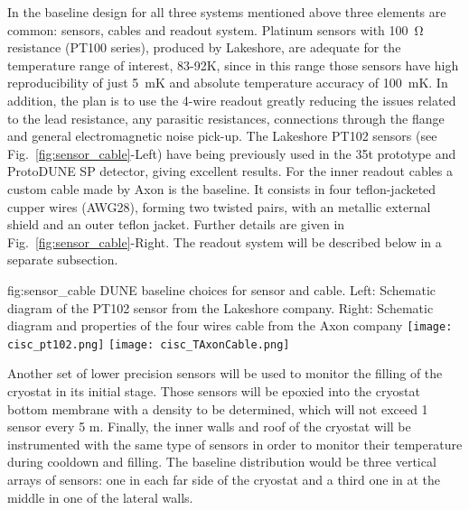 In the baseline design for all three systems mentioned above three elements are common: sensors, cables and readout system.
Platinum sensors with \SI{100}{\ohm} resistance (PT100 series), produced by Lakeshore,  
are adequate for the temperature range of interest, 83-92\si{K}, since in this range those sensors have high reproducibility
of just \SI{5}{mK} and absolute temperature accuracy of \SI{100}{mK}.
In addition, the plan is to use the 4-wire readout greatly reducing the issues related to the lead resistance, any parasitic resistances,
connections through the flange and general electromagnetic noise pick-up. The Lakeshore PT102 sensors (see Fig.~\ref{fig:sensor_cable}-Left)
have being previously used in the 35t prototype and ProtoDUNE SP detector,
giving excellent results. For the inner readout cables a custom cable made by Axon is the baseline. It consists in four teflon-jacketed 
cupper wires (AWG28), forming two twisted pairs, with an metallic external shield
and an outer teflon jacket. Further details are given in Fig.~\ref{fig:sensor_cable}-Right. 
The readout system will be described below in a separate subsection. 


\begin{dunefigure}[diag PT102]{fig:sensor_cable}
  {DUNE baseline choices for sensor and cable. Left: Schematic diagram of the PT102 sensor from the Lakeshore company. Right: Schematic diagram and properties of the four wires cable from the
  Axon company}
  \texttt{[image: cisc\_pt102.png]}
  \texttt{[image: cisc\_TAxonCable.png]}
\end{dunefigure}

Another set of lower precision sensors will be used to monitor the filling of the cryostat in its initial stage. Those sensors will be epoxied into the cryostat bottom membrane with
a density to be determined, which will not exceed 1 sensor every 5 m. 
Finally, the inner walls and roof of the cryostat will be instrumented with the same type of sensors in order to monitor their temperature during cooldown and filling.
The baseline distribution would be three vertical arrays of sensors: one in each far side of the cryostat and a third one in at the middle in one of the lateral walls. 


